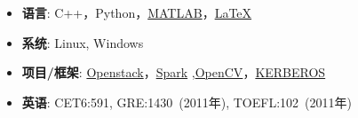   \begin{itemize}[leftmargin=*]
    \item \textbf{语言}: C++，Python，\href{http://cn.mathworks.com/products/matlab/}{MATLAB}，\href{http://www.latex-project.org/}{\LaTeX}
    \item \textbf{系统}: Linux, Windows
    \item \textbf{项目/框架}: \href{http://www.openstack.org/}{Openstack}，\href{http://spark.apache.org/}{Spark} ,\href{http://opencv.org/}{OpenCV}，\href{http://web.mit.edu/kerberos/}{KERBEROS}
    \item \textbf{英语}: CET6:591, GRE:1430~(2011年), TOEFL:102~(2011年)
  \end{itemize}
